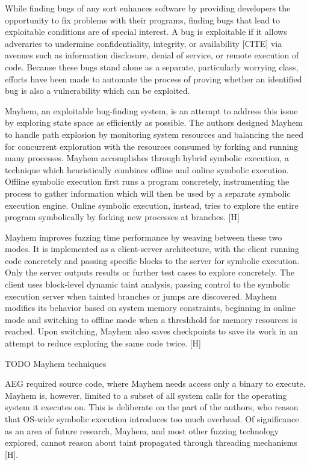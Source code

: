 \documentclass[11pt,expanded,copyright]{fsuthesis}
\begin{document}

While finding bugs of any sort enhances software by providing developers the opportunity to fix problems with their programs, finding bugs that lead to exploitable conditions are of special interest. A bug is exploitable if it allows adveraries to undermine confidentiality, integrity, or availability [CITE] via avenues such as information disclosure, denial of service, or remote execution of code. Because these bugs stand alone as a separate, particularly worrying class, efforts have been made to automate the process of proving whether an identified bug is also a vulnerability which can be exploited.

Mayhem, an exploitable bug-finding system, is an attempt to address this issue by exploring state space as efficiently as possible. The authors designed Mayhem to handle path explosion by monitoring system resources and balancing the need for concurrent exploration with the resources consumed by forking and running many processes. Mayhem accomplishes through hybrid symbolic execution, a technique which heuristically combines offline and online symbolic execution. Offline symbolic execution first runs a program concretely, instrumenting the process to gather information which will then be used by a separate symbolic execution engine. Online symbolic execution, instead, tries to explore the entire program symbolically by forking new processes at branches. [H]

Mayhem improves fuzzing time performance by weaving between these two modes. It is implemented as a client-server architecture, with the client running code concretely and passing specific blocks to the server for symbolic execution. Only the server outputs results or further test cases to explore concretely. The client uses block-level dynamic taint analysis, passing control to the symbolic execution server when tainted branches or jumps are discovered. Mayhem modifies its behavior based on system memory constraints, beginning in online mode and switching to offline mode when a threshhold for memory resources is reached. Upon switching, Mayhem also saves checkpoints to save its work in an attempt to reduce exploring the same code twice. [H]

TODO Mayhem techniques

AEG required source code, where Mayhem needs access only a binary to execute. Mayhem is, however, limited to a subset of all system calls for the operating system it executes on. This is deliberate on the part of the authors, who reason that OS-wide symbolic execution introduces too much overhead. Of significance as an area of future research, Mayhem, and most other fuzzing technology explored, cannot reason about taint propagated through threading mechanisms [H].
\end{document}
